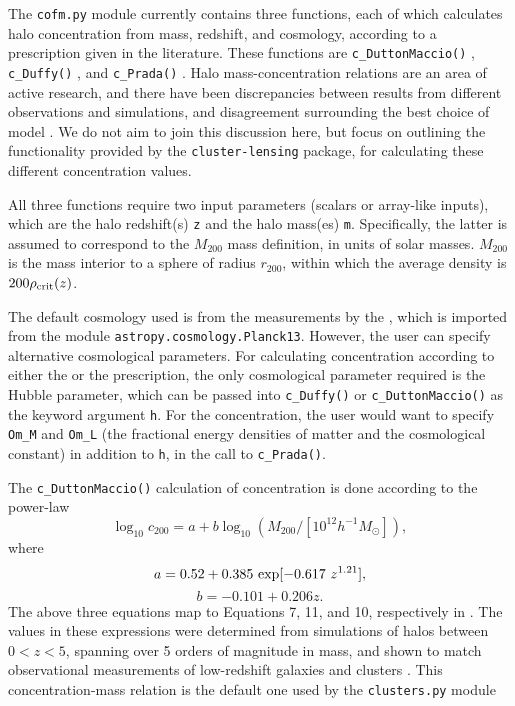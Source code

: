 \documentclass[twocolumn]{aastex6}
\newcommand{\code}{\lstinline[style=codeintext]}
\begin{document}
The \code{cofm.py} module currently contains three functions, each of which calculates halo concentration from mass, redshift, and cosmology, according to a prescription given in the literature. These functions are \code{c_DuttonMaccio()} \citep[for calculations following][]{Dutton14}, \code{c_Duffy()} \citep[following][]{Duffy08}, and \code{c_Prada()} \citep[for][]{Prada12}. Halo mass-concentration relations are an area of active research, and there have been discrepancies between results from different observations and simulations, and disagreement surrounding the best choice of model \citep[see {\emph e.g.}][]{Dutton14, Klypin16}. We do not aim to join this discussion here, but focus on outlining the functionality provided by the \code{cluster-lensing} package, for calculating these different concentration values.

All three functions require two input parameters (scalars or array-like inputs), which are the halo redshift(s) \code{z} and the halo mass(es) \code{m}. Specifically, the latter is assumed to correspond to the $M_{200}$ mass definition, in units of solar masses. $M_{200}$ is the mass interior to a sphere of radius $r_{200}$, within which the average density is $200\rho_{\rm crit}(z)$. 

The default cosmology used is from the measurements by the \citet{PlanckXVI}, which is imported from the module \code{astropy.cosmology.Planck13}. However, the user can specify alternative cosmological parameters. For calculating concentration according to either the \citet{Duffy08} or the \citet{Dutton14} prescription, the only cosmological parameter required is the Hubble parameter, which can be passed into \code{c_Duffy()} or \code{c_DuttonMaccio()} as the keyword argument \code{h}. For the \citet{Prada12} concentration, the user would want to specify \code{Om_M} and \code{Om_L} (the fractional energy densities of matter and the cosmological constant) in addition to \code{h}, in the call to \code{c_Prada()}.

The \code{c_DuttonMaccio()} calculation of concentration is done according to the power-law
\begin{equation}
\log_{10} c_{200} = a + b \log_{10}(M_{200} / [10^{12} h^{-1} M_{\odot}]), 
\end{equation}
where
\begin{equation}
a = 0.52 + 0.385\ {\rm exp}[-0.617\ z^{1.21}],
\end{equation}
\begin{equation}
b = -0.101 + 0.206 z.
\end{equation}
The above three equations map to Equations 7, 11, and 10, respectively in \citet{Dutton14}. The values in these expressions were determined from simulations of halos between $0 < z < 5$, spanning over 5 orders of magnitude in mass, and shown to match observational measurements of low-redshift galaxies and clusters \citep{Dutton14}. This concentration-mass relation is the default one used by the \code{clusters.py} module
\end{document}
